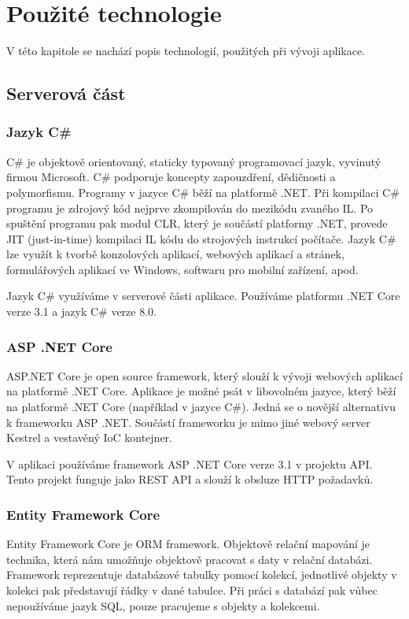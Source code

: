 
\chapter{Použité technologie}

V této kapitole se nachází popis technologií, použitých při vývoji aplikace.

\section{Serverová část}

\subsection{Jazyk C\#}
C\# je objektově orientovaný, staticky typovaný programovací jazyk, vyvinutý firmou Microsoft.
C\# podporuje koncepty zapouzdření, dědičnosti a polymorfismu. Programy v jazyce C\# běží na platformě .NET. 
Při kompilaci C\# programu je zdrojový kód nejprve zkompilován do mezikódu zvaného IL. 
Po spuštění programu pak modul CLR, který je součástí platformy .NET, provede JIT (just-in-time) kompilaci IL kódu do strojových instrukcí počítače.
Jazyk C\# lze využít k tvorbě konzolových aplikací, webových aplikací a stránek, formulářových aplikací ve Windows, softwaru pro mobilní zařízení, apod. 
\cite{CSharpDocs}

Jazyk C\# využíváme v serverové části aplikace. Používáme platformu .NET Core verze 3.1 a jazyk C\# verze 8.0.

\subsection{ASP .NET Core}
ASP.NET Core je open source framework, který slouží k vývoji webových aplikací na platformě .NET Core. Aplikace je možné psát v libovolném jazyce, který běží na platformě .NET Core (například v jazyce C\#). Jedná se o novější alternativu k frameworku ASP .NET. Součástí frameworku je mimo jiné webový server Kestrel a vestavěný IoC kontejner.
\cite{AspNetCoreDocs}

V aplikaci používáme framework ASP .NET Core verze 3.1 v projektu API. Tento projekt funguje jako REST API a slouží k obsluze HTTP požadavků.

\subsection{Entity Framework Core}
Entity Framework Core je ORM framework. Objektově relační mapování je technika, která nám umožňuje objektově pracovat s daty v relační databázi. Framework reprezentuje databázové tabulky pomocí kolekcí, jednotlivé objekty v kolekci pak představují řádky v dané tabulce. Při práci s databází pak vůbec nepoužíváme jazyk SQL, pouze pracujeme s objekty a kolekcemi.
\cite{EfCoreDocs}


